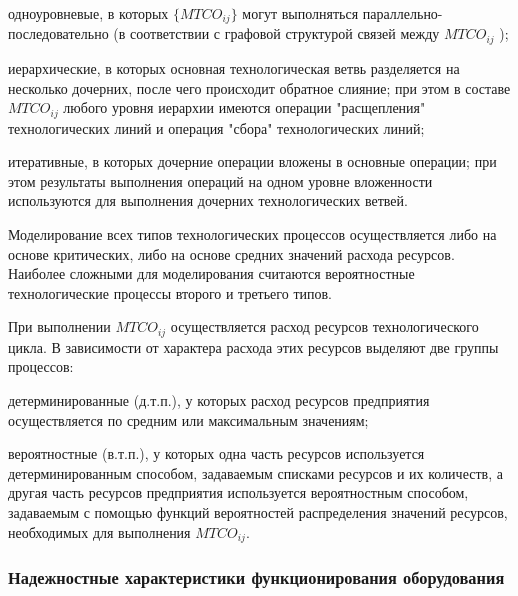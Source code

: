 \begin{textitemize}
	\item одноуровневые, в которых $\big\{MTCO_{ij}\big\}$ могут выполняться параллельно-последовательно (в соответствии с графовой структурой связей между $MTCO_{ij}$ );
	\item иерархические, в которых основная технологическая ветвь разделяется на несколько дочерних, после чего происходит обратное слияние; при этом в составе $MTCO_{ij}$ любого уровня иерархии имеются операции "расщепления"{} технологических линий и операция "сбора"{} технологических линий;
    \item итеративные, в которых дочерние операции вложены в основные операции; при этом результаты выполнения операций на одном уровне вложенности используются для выполнения дочерних технологических ветвей.
\end{textitemize}

Моделирование всех типов технологических процессов осуществляется либо на основе критических, либо на основе средних значений расхода ресурсов. Наиболее сложными для моделирования считаются вероятностные технологические процессы второго и третьего типов.

При выполнении $MTCO_{ij}$ осуществляется расход ресурсов технологического цикла. В зависимости от характера расхода этих ресурсов выделяют две группы процессов:

\begin{textitemize}
    \item детерминированные (д.т.п.), у которых расход ресурсов предприятия осуществляется по средним или максимальным значениям;
    \item вероятностные (в.т.п.), у которых одна часть ресурсов используется детерминированным способом, задаваемым списками ресурсов и их количеств, а другая часть ресурсов предприятия используется вероятностным способом, задаваемым с помощью функций вероятностей распределения значений ресурсов, необходимых для выполнения  $MTCO_{ij}$.
\end{textitemize}


\subsubsection{Надежностные характеристики функционирования оборудования}
\label{sec_chapter_enterprise_op_params}


